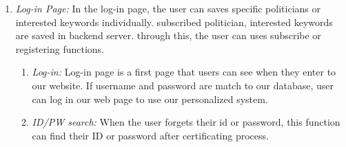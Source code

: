 \documentclass[conference]{IEEEtran}
\begin{document}
\begin{enumerate}
	\item \textit {Log-in Page:} 
In the log-in page, the user can saves specific politicians or interested keywords individually. subscribed politician, interested keywords are saved in backend server. through this, the user can uses subscribe or registering functions.\\
    \begin{enumerate}
    	\item \textit {Log-in:}  Log-in page is a first page that users can see when they enter to our website. If username and password are match to our database, user can log in our web page to use our personalized system.\\
        \item \textit {ID/PW search:} When the user forgets their id or password, this function can find their ID or password after  certificating process.\\
    \end{enumerate}
    

\end{enumerate}
\end{document}
